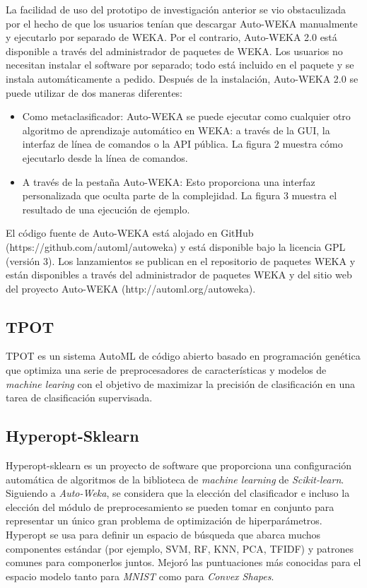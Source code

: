 La facilidad de uso del prototipo de investigación anterior se vio obstaculizada por el hecho de que los usuarios tenían que descargar Auto-WEKA manualmente y ejecutarlo por separado de WEKA. Por el contrario, Auto-WEKA 2.0 está disponible a través del administrador de paquetes de WEKA. Los usuarios no necesitan instalar el software por separado; todo está incluido en el paquete y se instala automáticamente a pedido. Después de la instalación, Auto-WEKA 2.0 se puede utilizar de dos maneras diferentes:
\begin{itemize}
    \item Como metaclasificador: Auto-WEKA se puede ejecutar como cualquier otro algoritmo de aprendizaje automático en WEKA: a través de la GUI, la interfaz de línea de comandos o la API pública. La figura 2 muestra cómo ejecutarlo desde la línea de comandos.
    \item A través de la pestaña Auto-WEKA: Esto proporciona una interfaz personalizada que oculta parte de la complejidad. La figura 3 muestra el resultado de una ejecución de ejemplo.
\end{itemize}

El código fuente de Auto-WEKA está alojado en GitHub (https://github.com/automl/autoweka) y está disponible bajo la licencia GPL (versión 3). Los lanzamientos se publican en el repositorio de paquetes WEKA y están disponibles a través del administrador de paquetes WEKA y del sitio web del proyecto Auto-WEKA (http://automl.org/autoweka).

\subsection{TPOT} 
TPOT \parencite{27} es un sistema AutoML de código abierto basado en programación genética que optimiza una serie de preprocesadores de características y modelos de \textit{machine learing} con el objetivo de maximizar la precisión de clasificación en una tarea de clasificación supervisada.

\subsection{Hyperopt-Sklearn} 
Hyperopt-sklearn \parencite{74} es un proyecto de software que proporciona una configuración automática de algoritmos de la biblioteca de \textit{machine learning} de \textit{Scikit-learn}. Siguiendo a \textit{Auto-Weka}, se considera que la elección del clasificador e incluso la elección del módulo de preprocesamiento se pueden tomar en conjunto para representar un único gran problema de optimización de hiperparámetros. Hyperopt se usa para definir un espacio de búsqueda que abarca muchos componentes estándar (por ejemplo, SVM, RF, KNN, PCA, TFIDF) y patrones comunes para componerlos juntos. Mejoró las puntuaciones más conocidas para el espacio modelo tanto para \textit{MNIST} como para \textit{Convex Shapes}.

